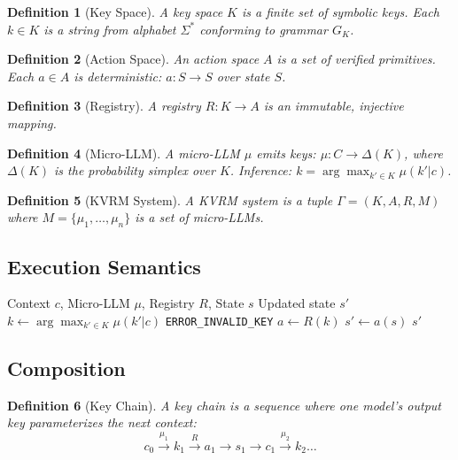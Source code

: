 \documentclass[11pt,a4paper]{article}
\newtheorem{definition}{Definition}[section]
\begin{document}
\begin{definition}[Key Space]
A key space $K$ is a finite set of symbolic keys. Each $k \in K$ is a string from alphabet $\Sigma^*$ conforming to grammar $G_K$.
\end{definition}

\begin{definition}[Action Space]
An action space $A$ is a set of verified primitives. Each $a \in A$ is deterministic: $a : S \to S$ over state $S$.
\end{definition}

\begin{definition}[Registry]
A registry $R : K \to A$ is an immutable, injective mapping.
\end{definition}

\begin{definition}[Micro-LLM]
A micro-LLM $\mu$ emits keys: $\mu : C \to \Delta(K)$, where $\Delta(K)$ is the probability simplex over $K$. Inference: $k = \arg\max_{k' \in K} \mu(k'|c)$.
\end{definition}

\begin{definition}[KVRM System]
A KVRM system is a tuple $\Gamma = (K, A, R, M)$ where $M = \{\mu_1, \dots, \mu_n\}$ is a set of micro-LLMs.
\end{definition}

\subsection{Execution Semantics}

\begin{algorithm}
\caption{KVRM Execution}
\label{alg:exec}
\begin{algorithmic}[1]
\Require Context $c$, Micro-LLM $\mu$, Registry $R$, State $s$
\Ensure Updated state $s'$
\State $k \gets \arg\max_{k' \in K} \mu(k'|c)$ 
    \State \Return \texttt{ERROR\_INVALID\_KEY}
\EndIf
\State $a \gets R(k)$ 
\State $s' \gets a(s)$ 
\State \Return $s'$
\end{algorithmic}
\end{algorithm}

\subsection{Composition}

\begin{definition}[Key Chain]
A key chain is a sequence where one model's output key parameterizes the next context:
$$c_0 \xrightarrow{\mu_1} k_1 \xrightarrow{R} a_1 \to s_1 \to c_1 \xrightarrow{\mu_2} k_2 \dots$$
\end{definition}
\end{document}
